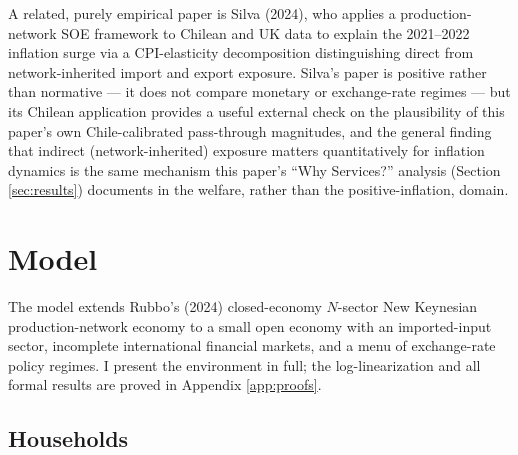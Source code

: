 \documentclass[12pt]{article}
\begin{document}
A related, purely empirical paper is Silva (2024), who applies a production-network SOE framework to
Chilean and UK data to explain the 2021--2022 inflation surge via a CPI-elasticity decomposition
distinguishing direct from network-inherited import and export exposure. Silva's paper is positive
rather than normative --- it does not compare monetary or exchange-rate regimes --- but its Chilean
application provides a useful external check on the plausibility of this paper's own Chile-calibrated
pass-through magnitudes, and the general finding that indirect (network-inherited) exposure matters
quantitatively for inflation dynamics is the same mechanism this paper's ``Why Services?'' analysis
(Section \ref{sec:results}) documents in the welfare, rather than the positive-inflation, domain.

\section{Model}
\label{sec:model}

The model extends Rubbo's (2024) closed-economy $N$-sector New Keynesian production-network economy
to a small open economy with an imported-input sector, incomplete international financial markets,
and a menu of exchange-rate policy regimes. I present the environment in full; the log-linearization
and all formal results are proved in Appendix \ref{app:proofs}.

\subsection{Households}
\end{document}
